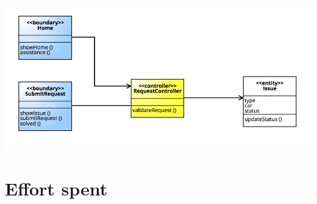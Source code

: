 \documentclass[]{article}
\begin{document}
\centerline{\includegraphics{./images/BCE_Operator.png}}

\section{Effort spent}\label{effort-spent}
\end{document}
